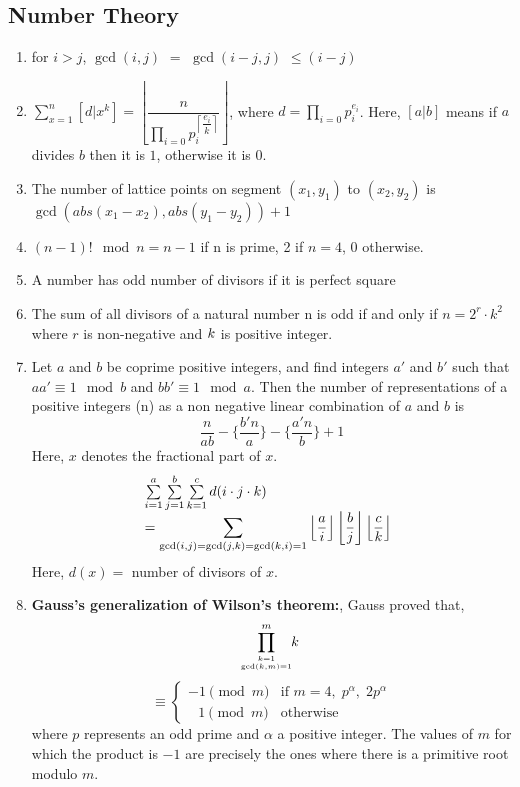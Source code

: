 \subsection{Number Theory}
\begin{enumerate}[resume]
    \item for $i > j$, $\displaystyle \gcd(i, j)$ $=$ $\displaystyle \gcd(i -j, j)$ $\displaystyle \leq (i -j)$
    \item $\displaystyle \sum_{x = 1}^n \left[ d | x^k \right] = \left \lfloor\dfrac{n}{\prod_{i = 0}{p_i^{\left \lceil \dfrac{e_i}{k}\right \rceil}}}\right \rfloor$,
    where $d = \prod_{i = 0}{p_i^{e_i}}$. Here, $[a | b]$ means if $\displaystyle a$ divides $b$ then it is $\displaystyle 1$, otherwise it is $0$.
    \item The number of lattice points on segment $\displaystyle (x_1,y_1)$ to $\displaystyle (x_2,y_2)$ is $\displaystyle \gcd(abs(x_1-x_2),abs(y_1-y_2)) + 1$
    \item $\displaystyle (n-1)! \mod  n = n -1$ if n is prime, 2 if $n = 4$, $0$ otherwise.
    \item A number has odd number of divisors if it is perfect square
    \item The sum of all divisors of a natural number n is odd if and only if $n=2^r\cdot k^2$ where $r$ is non-negative and $\displaystyle \displaystyle k$ is positive integer.
    \item Let $\displaystyle a$ and $b$ be coprime positive integers, and find integers $\displaystyle a{\prime}$ and $b{\prime}$ such that $\displaystyle aa{\prime} \equiv 1 \mod b$ and $bb{\prime} \equiv 1 \mod a$. Then the number of representations of a positive integers (n) as a non negative linear combination of $\displaystyle a$ and $b$ is
    \[\displaystyle \frac{n}{ab}-\Big\{\frac{b{\prime} n}{a}\Big\}-\Big\{\frac{a{\prime} n}{b}\Big\} + 1\]
    Here, $\displaystyle {x}$ denotes the fractional part of $\displaystyle x$.
\[
\begin{array}{@{}l}
\sum \limits_{i=1}^{a}\sum \limits_{j=1}^{b}\sum \limits_{k=1}^{c} d(i \cdot j \cdot k)
\\ =
\displaystyle \sum \limits_{\gcd (i,j)=\gcd (j,k) = \gcd (k,i) =1}
\displaystyle \left \lfloor \dfrac{a}{i}\right \rfloor \left \lfloor \dfrac{b}{j}\right \rfloor \left \lfloor \dfrac{c}{k} \right \rfloor
\end{array}
\]
    Here, $d(x) =$ number of divisors of $\displaystyle x$.
    \item \textbf{Gauss’s generalization of Wilson’s theorem:},
    Gauss proved that,
    \[\displaystyle \prod \limits_{k=1 \atop \gcd(k,m)=1}^{m}\!\!k\ \]
    \[\displaystyle \equiv {\begin{cases}-1{\pmod {m}}&{\text{if }}m=4,\;p^{\alpha },\;2p^{\alpha }\\\;\;\,1{\pmod {m}}&{\text{otherwise}}\end{cases}}\]
    where $\displaystyle p$ represents an odd prime and $\displaystyle \alpha$ a positive integer. The values of $m$ for which the product is $-1$ are precisely the ones where there is a primitive root modulo $m$.
\end{enumerate}
